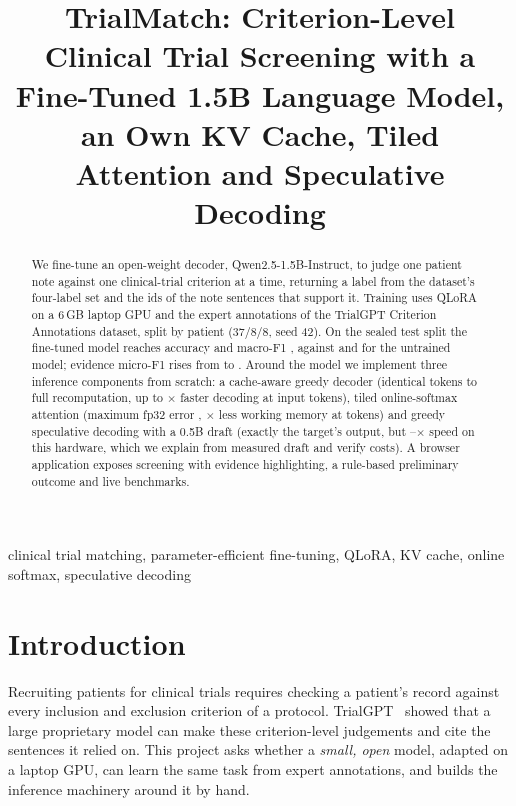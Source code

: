 \documentclass[conference]{IEEEtran}
\begin{document}
\title{TrialMatch: Criterion-Level Clinical Trial Screening with a Fine-Tuned 1.5B Language Model, an Own KV Cache, Tiled Attention and Speculative Decoding}

\author{
}

\maketitle

\begin{abstract}
We fine-tune an open-weight decoder, Qwen2.5-1.5B-Instruct, to judge one patient note against one clinical-trial criterion at a time, returning a label from the dataset's four-label set and the ids of the note sentences that support it. Training uses QLoRA on a 6\,GB laptop GPU and the expert annotations of the TrialGPT Criterion Annotations dataset, split by patient (37/8/8, seed 42). On the sealed test split the fine-tuned model reaches accuracy \TestAccFT{} and macro-F1 \TestFoneFT{}, against \TestAccBase{} and \TestFoneBase{} for the untrained model; evidence micro-F1 rises from \TestEvBase{} to \TestEvFT{}. Around the model we implement three inference components from scratch: a cache-aware greedy decoder (identical tokens to full recomputation, up to \KvMaxSpeedup$\times$ faster decoding at \KvMaxInput{} input tokens), tiled online-softmax attention (maximum fp32 error \AttnErrThirtyTwo{}, \AttnMemRatio$\times$ less working memory at \AttnLongSeq{} tokens) and greedy speculative decoding with a 0.5B draft (exactly the target's output, but \SpecWorstSpeedup--\SpecBestSpeedup$\times$ speed on this hardware, which we explain from measured draft and verify costs). A browser application exposes screening with evidence highlighting, a rule-based preliminary outcome and live benchmarks.
\end{abstract}

\begin{IEEEkeywords}
clinical trial matching, parameter-efficient fine-tuning, QLoRA, KV cache, online softmax, speculative decoding
\end{IEEEkeywords}

\section{Introduction}
Recruiting patients for clinical trials requires checking a patient's record against every inclusion and exclusion criterion of a protocol. TrialGPT~\cite{jin2024trialgpt} showed that a large proprietary model can make these criterion-level judgements and cite the sentences it relied on. This project asks whether a \emph{small, open} model, adapted on a laptop GPU, can learn the same task from expert annotations, and builds the inference machinery around it by hand.
\end{document}

